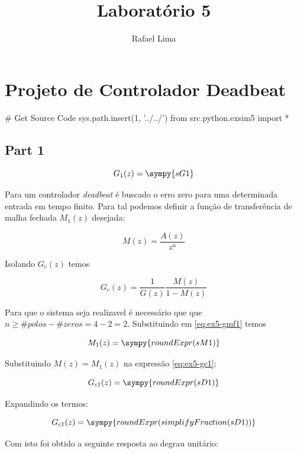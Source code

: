 \documentclass[a4paper,11pt]{article}
\title{Laboratório 5} %
\author{Rafael Lima}
\begin{document}

\section{Projeto de Controlador Deadbeat}

\begin{sympycode}
# Get Source Code
sys.path.insert(1, '../../')
from src.python.exsim5 import *
\end{sympycode}


\subsection{Part 1}

\begin{equation}\label{eq:ex5-g1}
    G_1(z) = \sympy{sG1}
\end{equation}

Para um controlador \textit{deadbeat} é buscado o erro zero para uma determinada entrada em tempo finito. Para tal podemos definir a função de transferência de malha fechada $M_1(z)$ desejada:

\begin{equation}\label{eq:ex5-gmf1}
    M(z) = \frac{A(z)}{z^n}
\end{equation}

Isolando $G_c(z)$ temos

\begin{equation}\label{eq:ex5-gc1}
    G_{c}(z) = \frac{1}{G(z)}\frac{M(z)}{1-M(z)}
\end{equation}

Para que o sistema seja realizavel é necessário que que $n \ge \#polos - \#zeros = 4  - 2 = 2$. Substituindo em \ref{eq:ex5-gmf1} temos

$$
M_1(z) = \sympy{roundExpr(sM1)}
$$

Substituindo $M(z) = M_1(z)$ na expressão \ref{eq:ex5-gc1}:

$$G_{c1}(z) = \sympy{roundExpr(sD1)}$$

Expandindo os termos:

$$G_{c1}(z) = \sympy{roundExpr(simplifyFraction(sD1))}$$

Com isto foi obtido a seguinte resposta ao degrau unitário:
\end{document}
